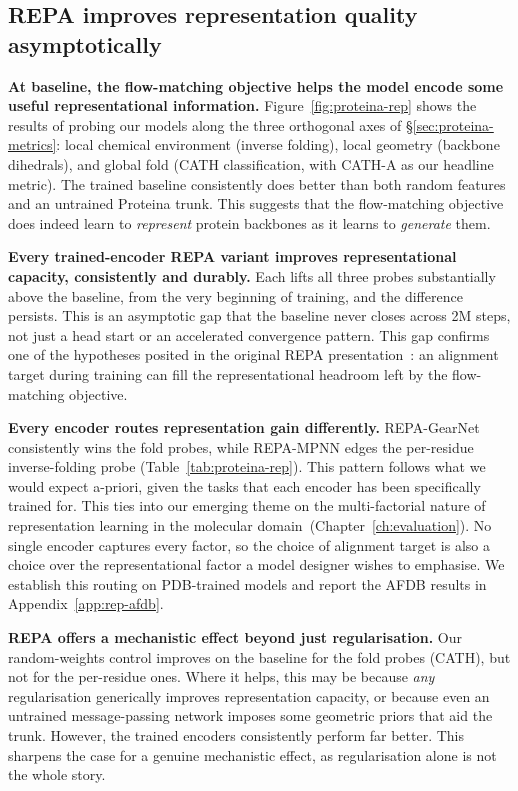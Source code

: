 \documentclass[12pt,a4paper,twoside]{report}
\begin{document}
\subsection{REPA improves representation quality asymptotically}
\label{sec:proteina-rep}

\textbf{At baseline, the flow-matching objective helps the model encode some useful representational information.} Figure~\ref{fig:proteina-rep} shows the results of probing our models along the three orthogonal axes of \S\ref{sec:proteina-metrics}: local chemical environment (inverse folding), local geometry (backbone dihedrals), and global fold (CATH classification, with CATH-A as our headline metric). The trained baseline consistently does better than both random features and an untrained Proteina trunk. This suggests that the flow-matching objective does indeed learn to \emph{represent} protein backbones as it learns to \emph{generate} them.



\textbf{Every trained-encoder REPA variant improves representational capacity, consistently and durably.} Each lifts all three probes substantially above the baseline, from the very beginning of training, and the difference persists. This is an asymptotic gap that the baseline never closes across 2M steps, not just a head start or an accelerated convergence pattern. This gap confirms one of the hypotheses posited in the original REPA presentation~\cite{REPA}: an alignment target during training can fill the representational headroom left by the flow-matching objective.

\textbf{Every encoder routes representation gain differently.} REPA-GearNet consistently wins the fold probes, while REPA-MPNN edges the per-residue inverse-folding probe (Table~\ref{tab:proteina-rep}). This pattern follows what we would expect a-priori, given the tasks that each encoder has been specifically trained for. This ties into our emerging theme on the multi-factorial nature of representation learning in the molecular domain~(Chapter~\ref{ch:evaluation}). No single encoder captures every factor, so the choice of alignment target is also a choice over the representational factor a model designer wishes to emphasise. We establish this routing on PDB-trained models and report the AFDB results in Appendix~\ref{app:rep-afdb}.



\textbf{REPA offers a mechanistic effect beyond just regularisation.} Our random-weights control improves on the baseline for the fold probes (CATH), but not for the per-residue ones. Where it helps, this may be because \emph{any} regularisation generically improves representation capacity, or because even an untrained message-passing network imposes some geometric priors that aid the trunk. However, the trained encoders consistently perform far better. This sharpens the case for a genuine mechanistic effect, as regularisation alone is not the whole story.
\end{document}
